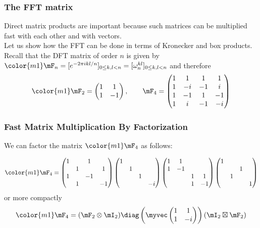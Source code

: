 \begin{frame}
\frametitle{The FFT matrix}
Direct matrix products are important because such matrices
can be multiplied fast with each other and with vectors.\\
\medskip
Let us show how the FFT can be done in terms of Kronecker and box products.  
\medskip
Recall that the DFT matrix of order $n$ is given by 
$\color{m1}
\mF_n = [e^{-2\pi i kl/n}]_{0\leq k,l<n}= [\omega_n^{kl}]_{0\leq k,l<n}
$
and therefore
$$\color{m1}
\mF_2 = \begin{pmatrix}1 & 1 \\ 1 & -1\end{pmatrix},\qquad
\mF_4 = \begin{pmatrix} 1 & 1 & 1 & 1 \\
                        1 & -i & -1 & i \\
                        1 & -1 & 1 & -1 \\
                        1 & i & -1 & -i
\end{pmatrix}
$$
\end{frame}

\begin{frame}
\frametitle{Fast Matrix Multiplication By Factorization}
We can factor the matrix $\color{m1}\mF_4$ as follows:

{\small
$$\color{m1}
\mF_4 = 
\begin{pmatrix}
1 &   & 1 &  \\
  & 1 &   & 1\\
1 &   & -1 &  \\
  & 1 &    & -1
\end{pmatrix}
\begin{pmatrix}
1 &   &   &  \\
  & 1 &   &  \\
  &   & 1 &  \\
  &   &   & -i\\
\end{pmatrix}
\begin{pmatrix}
1 & 1 &   &  \\
1 & -1 &   &  \\
  &   & 1 & 1\\
  &   & 1 & -1\\
\end{pmatrix}
\begin{pmatrix}
1 &   &   &  \\
  &   & 1 &  \\
  & 1 &   &  \\
  &   &   & 1\\
\end{pmatrix}
$$}
or more compactly
$$\color{m1}
\mF_4 = (\mF_2\otimes\mI_2)\diag\left(\myvec\begin{pmatrix}
1 & 1\\
1 & -i
\end{pmatrix}\right)
(\mI_2\boxtimes\mF_2)
$$
\end{frame}

